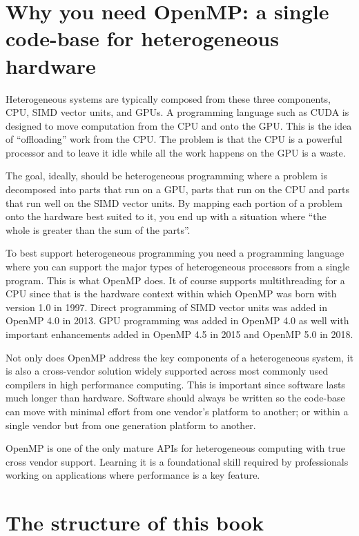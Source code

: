 \section{Why you need OpenMP: a single code-base for heterogeneous hardware}

Heterogeneous systems are typically composed from these three components, CPU, SIMD vector
units, and GPUs.  A programming language such as CUDA is designed to move computation from 
the CPU and onto the GPU.   This is the idea of ``offloading'' work from the CPU.  The problem
is that the CPU is a powerful processor and to leave it idle while all the work happens on the 
GPU is a waste.

The goal, ideally, should be heterogeneous programming where a problem is decomposed
into parts that run on a GPU, parts that  run on the CPU and parts that run well 
on the SIMD vector units.  By mapping each portion of a problem onto the hardware
best suited to it, you end up with a situation where ``the whole is greater than the sum of the parts''.

To best support heterogeneous programming you need a programming language where
you can support the major types of heterogeneous processors from a single program.
This is what OpenMP does.  It of course supports multithreading for a CPU since that 
is the hardware context within which OpenMP was born with version 1.0 in 1997.  Direct 
programming of SIMD vector units was added in OpenMP 4.0 in 2013.   GPU programming 
was added in OpenMP 4.0 as well with important enhancements added in OpenMP 4.5 in 
2015 and OpenMP 5.0 in 2018.

Not only does OpenMP address the key components of a heterogeneous system, it is also
a cross-vendor solution widely supported across most commonly used compilers
in high performance computing.  This is important since software lasts much longer
than hardware.  Software should always be written so the code-base can move 
with minimal effort from one vendor's platform to another; or within a single vendor
but from one generation platform to another.   

OpenMP is one of the only mature APIs for heterogeneous computing with true cross vendor support.
Learning it is a foundational skill required by professionals working on applications where performance
is a key feature.  



\section{The structure of this book}

